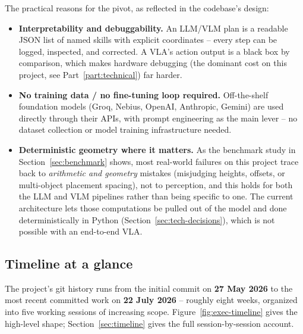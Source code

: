 The practical reasons for the pivot, as reflected in the codebase's design:
\begin{itemize}[nosep]
  \item \textbf{Interpretability and debuggability.} An LLM/VLM plan is a
    readable JSON list of named skills with explicit coordinates -- every
    step can be logged, inspected, and corrected. A VLA's action output is a
    black box by comparison, which makes hardware debugging (the dominant
    cost on this project, see Part~\ref{part:technical}) far harder.
  \item \textbf{No training data / no fine-tuning loop required.} Off-the-shelf
    foundation models (Groq, Nebius, OpenAI, Anthropic, Gemini) are used
    directly through their APIs, with prompt engineering as the main lever --
    no dataset collection or model training infrastructure needed.
  \item \textbf{Deterministic geometry where it matters.} As the benchmark
    study in Section~\ref{sec:benchmark} shows, most real-world failures on
    this project trace back to \emph{arithmetic and geometry} mistakes
    (misjudging heights, offsets, or multi-object placement spacing), not to
    perception, and this holds for both the LLM and VLM pipelines rather
    than being specific to one. The current architecture lets those
    computations be pulled out of the model and done deterministically in
    Python (Section~\ref{sec:tech-decisions}), which is not possible with an
    end-to-end VLA.
\end{itemize}

\subsection*{Timeline at a glance}

The project's git history runs from the initial commit on
\textbf{27 May 2026} to the most recent committed work on
\textbf{22 July 2026} -- roughly eight weeks, organized into five working
sessions of increasing scope. Figure~\ref{fig:exec-timeline} gives the
high-level shape; Section~\ref{sec:timeline} gives the full session-by-session
account.

